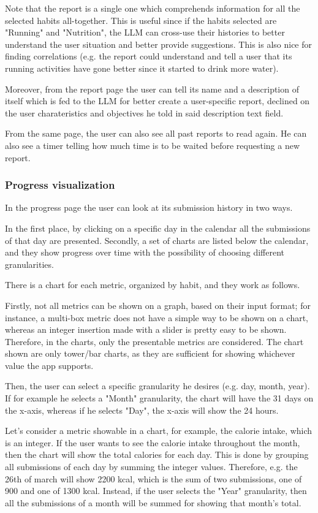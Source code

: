 \documentclass{article}
\begin{document}
Note that the report is a single one which comprehends information for all the selected habits all-together.
This is useful since if the habits selected are "Running" and "Nutrition", the LLM can cross-use their histories to better understand the user situation and better provide suggestions.
This is also nice for finding correlations (e.g. the report could understand and tell a user that its running activities have gone better since it started to drink more water).

Moreover, from the report page the user can tell its name and a description of itself which is fed to the LLM for better create a user-specific report, declined on the user charateristics and objectives he told in said description text field.

From the same page, the user can also see all past reports to read again.
He can also see a timer telling how much time is to be waited before requesting a new report.

\subsubsection{Progress visualization}

In the progress page the user can look at its submission history in two ways.

In the first place, by clicking on a specific day in the calendar all the submissions of that day are presented.
Secondly, a set of charts are listed below the calendar, and they show progress over time with the possibility of choosing different granularities.

There is a chart for each metric, organized by habit, and they work as follows.

Firstly, not all metrics can be shown on a graph, based on their input format; for instance, a multi-box metric does not have a simple way to be shown on a chart, whereas an integer insertion made with a slider is pretty easy to be shown.
Therefore, in the charts, only the presentable metrics are considered.
The chart shown are only tower/bar charts, as they are sufficient for showing whichever value the app supports.

Then, the user can select a specific granularity he desires (e.g. day, month, year).
If for example he selects a "Month" granularity, the chart will have the 31 days on the x-axis, whereas if he selects "Day", the x-axis will show the 24 hours.

Let's consider a metric showable in a chart, for example, the calorie intake, which is an integer.
If the user wants to see the calorie intake throughout the month, then the chart will show the total calories for each day.
This is done by grouping all submissions of each day by summing the integer values.
Therefore, e.g. the 26th of march will show 2200 kcal, which is the sum of two submissions, one of 900 and one of 1300 kcal.
Instead, if the user selects the "Year" granularity, then all the submissions of a month will be summed for showing that month's total.
\end{document}
